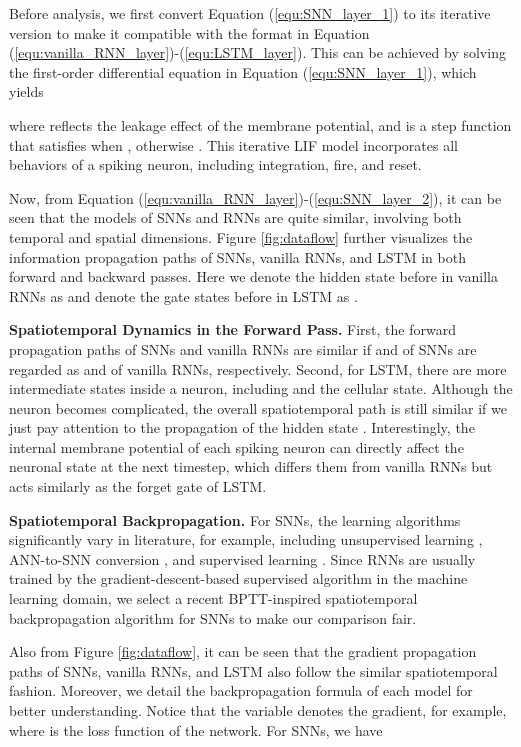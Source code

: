 \documentclass[journal,10pt,twocolumn]{IEEETran}
\begin{document}
Before analysis, we first convert Equation (\ref{equ:SNN_layer_1}) to its iterative version to make it compatible with the format in Equation (\ref{equ:vanilla_RNN_layer})-(\ref{equ:LSTM_layer}). This can be achieved by solving the first-order differential equation in Equation (\ref{equ:SNN_layer_1}), which yields

where  reflects the leakage effect of the membrane potential, and  is a step function that satisfies  when , otherwise . This iterative LIF model incorporates all behaviors of a spiking neuron, including integration, fire, and reset. 

Now, from Equation (\ref{equ:vanilla_RNN_layer})-(\ref{equ:SNN_layer_2}), it can be seen that the models of SNNs and RNNs are quite similar, involving both temporal and spatial dimensions. Figure \ref{fig:dataflow} further visualizes the information propagation paths of SNNs, vanilla RNNs, and LSTM in both forward and backward passes. Here we denote the hidden state before  in vanilla RNNs as  and denote the gate states before  in LSTM as . 

\textbf{Spatiotemporal Dynamics in the Forward Pass.} First, the forward propagation paths of SNNs and vanilla RNNs are similar if  and  of SNNs are regarded as  and  of vanilla RNNs, respectively. Second, for LSTM, there are more intermediate states inside a neuron, including  and the cellular state. Although the neuron becomes complicated, the overall spatiotemporal path is still similar if we just pay attention to the propagation of the hidden state . Interestingly, the internal membrane potential of each spiking neuron can directly affect the neuronal state at the next timestep, which differs them from vanilla RNNs but acts similarly as the forget gate of LSTM.

\textbf{Spatiotemporal Backpropagation.} For SNNs, the learning algorithms significantly vary in literature, for example, including unsupervised learning \cite{diehl2015unsupervised}, ANN-to-SNN conversion \cite{diehl2015fast}, and supervised learning \cite{lee2016training,wu2018spatio,wu2019direct}. Since RNNs are usually trained by the gradient-descent-based supervised algorithm in the machine learning domain, we select a recent BPTT-inspired spatiotemporal backpropagation algorithm \cite{wu2018spatio,wu2019direct} for SNNs to make our comparison fair. 

Also from Figure \ref{fig:dataflow}, it can be seen that the gradient propagation paths of SNNs, vanilla RNNs, and LSTM also follow the similar spatiotemporal fashion. Moreover, we detail the backpropagation formula of each model for better understanding. Notice that the variable  denotes the gradient, for example,  where  is the loss function of the network. For SNNs, we have
\begin{comment}

\end{comment}
\end{document}
